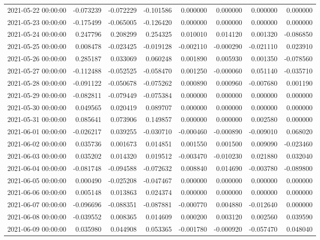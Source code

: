 \begin{tabular}{lrrrrrrr}
2021-05-22 00:00:00 & -0.073239 & -0.072229 & -0.101586 & 0.000000 & 0.000000 & 0.000000 & 0.000000 \\
2021-05-23 00:00:00 & -0.175499 & -0.065005 & -0.126420 & 0.000000 & 0.000000 & 0.000000 & 0.000000 \\
2021-05-24 00:00:00 & 0.247796 & 0.208299 & 0.254325 & 0.010010 & 0.014120 & 0.001320 & -0.086850 \\
2021-05-25 00:00:00 & 0.008478 & -0.023425 & -0.019128 & -0.002110 & -0.000290 & -0.021110 & 0.023910 \\
2021-05-26 00:00:00 & 0.285187 & 0.033069 & 0.060248 & 0.001890 & 0.005930 & 0.001350 & -0.078560 \\
2021-05-27 00:00:00 & -0.112488 & -0.052525 & -0.058470 & 0.001250 & -0.000060 & 0.051140 & -0.035710 \\
2021-05-28 00:00:00 & -0.091122 & -0.050678 & -0.075262 & 0.000890 & 0.000960 & -0.007680 & 0.001190 \\
2021-05-29 00:00:00 & -0.082811 & -0.079449 & -0.075384 & 0.000000 & 0.000000 & 0.000000 & 0.000000 \\
2021-05-30 00:00:00 & 0.049565 & 0.020419 & 0.089707 & 0.000000 & 0.000000 & 0.000000 & 0.000000 \\
2021-05-31 00:00:00 & 0.085641 & 0.073906 & 0.149857 & 0.000000 & 0.000000 & 0.002580 & 0.000000 \\
2021-06-01 00:00:00 & -0.026217 & 0.039255 & -0.030710 & -0.000460 & -0.000890 & -0.009010 & 0.068020 \\
2021-06-02 00:00:00 & 0.035736 & 0.001673 & 0.014851 & 0.001550 & 0.001500 & 0.009090 & -0.023460 \\
2021-06-03 00:00:00 & 0.035202 & 0.014320 & 0.019512 & -0.003470 & -0.010230 & 0.021880 & 0.032040 \\
2021-06-04 00:00:00 & -0.081748 & -0.094588 & -0.072632 & 0.008840 & 0.014690 & -0.003780 & -0.089800 \\
2021-06-05 00:00:00 & 0.000490 & -0.025208 & -0.047467 & 0.000000 & 0.000000 & 0.000000 & 0.000000 \\
2021-06-06 00:00:00 & 0.005148 & 0.013863 & 0.024374 & 0.000000 & 0.000000 & 0.000000 & 0.000000 \\
2021-06-07 00:00:00 & -0.096696 & -0.088351 & -0.087881 & -0.000770 & 0.004880 & -0.012640 & 0.000000 \\
2021-06-08 00:00:00 & -0.039552 & 0.008365 & 0.014609 & 0.000200 & 0.003120 & 0.002560 & 0.039590 \\
2021-06-09 00:00:00 & 0.035980 & 0.044908 & 0.053365 & -0.001780 & -0.000920 & -0.057470 & 0.048040 \\

\end{tabular}
